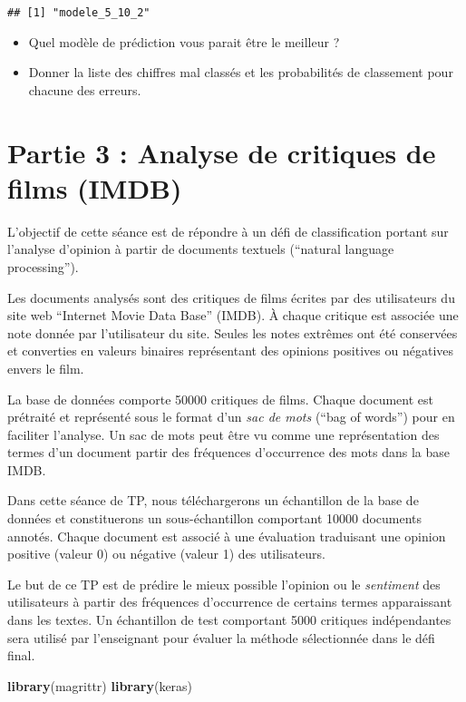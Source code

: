 \documentclass[]{article}
\newenvironment{Shaded}{\begin{snugshade}}{\end{snugshade}}
\newcommand{\KeywordTok}[1]{\textcolor[rgb]{0.13,0.29,0.53}{\textbf{#1}}}
\newcommand{\NormalTok}[1]{#1}
\begin{document}
\begin{verbatim}
## [1] "modele_5_10_2"
\end{verbatim}

\begin{itemize}
\item
  Quel modèle de prédiction vous parait être le meilleur ?
\item
  Donner la liste des chiffres mal classés et les probabilités de
  classement pour chacune des erreurs.
\end{itemize}

\section{Partie 3 : Analyse de critiques de films
(IMDB)}\label{partie-3-analyse-de-critiques-de-films-imdb}

L'objectif de cette séance est de répondre à un défi de classification
portant sur l'analyse d'opinion à partir de documents textuels
(``natural language processing'').

Les documents analysés sont des critiques de films écrites par des
utilisateurs du site web ``Internet Movie Data Base'' (IMDB). À chaque
critique est associée une note donnée par l'utilisateur du site. Seules
les notes extrêmes ont été conservées et converties en valeurs binaires
représentant des opinions positives ou négatives envers le film.

La base de données comporte 50000 critiques de films. Chaque document
est prétraité et représenté sous le format d'un \emph{sac de mots}
(``bag of words'') pour en faciliter l'analyse. Un sac de mots peut être
vu comme une représentation des termes d'un document partir des
fréquences d'occurrence des mots dans la base IMDB.

Dans cette séance de TP, nous téléchargerons un échantillon de la base
de données et constituerons un sous-échantillon comportant 10000
documents annotés. Chaque document est associé à une évaluation
traduisant une opinion positive (valeur 0) ou négative (valeur 1) des
utilisateurs.

Le but de ce TP est de prédire le mieux possible l'opinion ou le
\emph{sentiment} des utilisateurs à partir des fréquences d'occurrence
de certains termes apparaissant dans les textes. Un échantillon de test
comportant 5000 critiques indépendantes sera utilisé par l'enseignant
pour évaluer la méthode sélectionnée dans le défi final.

\begin{Shaded}
\begin{Highlighting}[]
\KeywordTok{library}\NormalTok{(magrittr)}
\KeywordTok{library}\NormalTok{(keras)}
\end{Highlighting}
\end{Shaded}
\end{document}
